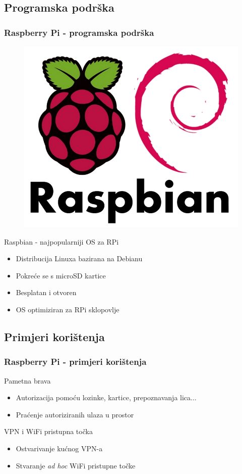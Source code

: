 \documentclass[12pt]{beamer}
\begin{document}
\subsection{Programska podrška}
\begin{frame}
	\frametitle{Raspberry Pi - programska podrška}
	\begin{figure}[h]
			\begin{minipage}{0.2\textwidth}
				\centering
				\includegraphics[width=\linewidth]{slike/raspbian-logo.png}
			\end{minipage}
		\end{figure}
	Raspbian - najpopularniji OS za RPi
	\begin{itemize}
		\item Distribucija Linuxa bazirana na Debianu
		\item Pokreće se s microSD kartice
		\item Besplatan i otvoren
		\item OS optimiziran za RPi sklopovlje
	\end{itemize}
\end{frame}

\subsection{Primjeri korištenja}
\begin{frame}
	\frametitle{Raspberry Pi - primjeri korištenja}
	Pametna brava
	\begin{itemize}
		\item Autorizacija pomoću lozinke, kartice, prepoznavanja lica...
		\item Praćenje autoriziranih ulaza u prostor
	\end{itemize}
	\vfill
	VPN i WiFi pristupna točka
	\begin{itemize}
		\item Ostvarivanje kućnog VPN-a
		\item Stvaranje \textit{ad hoc} WiFi pristupne točke
	\end{itemize}
\end{frame}
\end{document}
